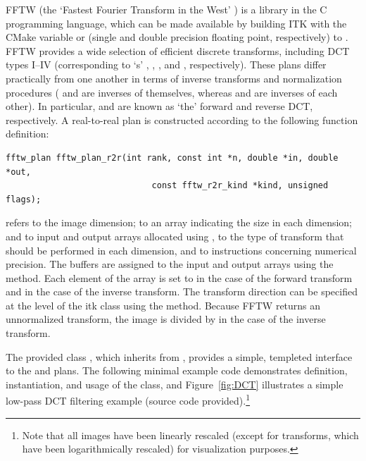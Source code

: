FFTW (the `Fastest Fourier Transform in the West' \cite{Frigo2005}) is a library in the C programming language, which can be made available by building ITK with the CMake variable  or  (single and double precision floating point, respectively) to .  FFTW provides a wide selection of efficient discrete transforms, including DCT types I--IV (corresponding to `s' , , , and , respectively).  These plans differ practically from one another in terms of inverse transforms and normalization procedures ( and  are inverses of themselves, whereas  and  are inverses of each other).  In particular,  and  are known as `the' forward and reverse DCT, respectively.  A real-to-real plan is constructed according to the following function definition:

\small
\begin{verbatim}
fftw_plan fftw_plan_r2r(int rank, const int *n, double *in, double *out,
                             const fftw_r2r_kind *kind, unsigned flags);
\end{verbatim}
\normalsize

 refers to the image dimension;  to an array indicating the size in each dimension;  and  to input and output arrays allocated using ,  to the type of transform that should be performed in each dimension, and  to instructions concerning numerical precision.  The  buffers are assigned to the input and output arrays using the  method.  Each element of the  array is set to  in the case of the forward transform and  in the case of the inverse transform.  The transform direction can be specified at the level of the itk class using the  method.  Because FFTW returns an unnormalized transform, the image is divided by  in the case of the inverse transform.

The provided class , which inherits from , provides a simple, templeted interface to the  and  plans.  The following minimal example code demonstrates definition, instantiation, and usage of the class, and Figure~\ref{fig:DCT} illustrates a simple low-pass DCT filtering example (source code provided).\footnote{Note that all images have been linearly rescaled (except for transforms, which have been logarithmically rescaled) for visualization purposes.}

